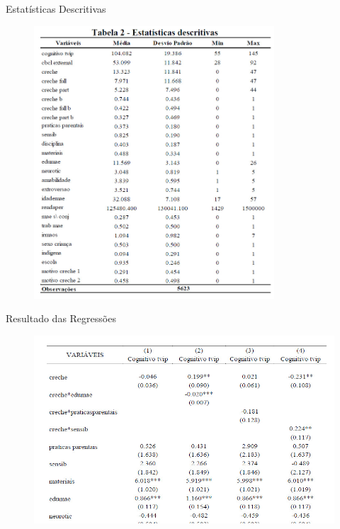 \documentclass[10pt]{Beamer}
\begin{document}
	
\begin{frame}{Estatísticas Descritivas}

\begin{figure}[h]
\centering
\includegraphics[width=0.8\textwidth]{estat}
\end{figure}
	
\end{frame}

\begin{frame}{Resultado das Regressões}

\begin{figure}[h]
\centering
\includegraphics[width=1.0\textwidth]{Tab3}
\end{figure}

\end{frame}
\end{document}
